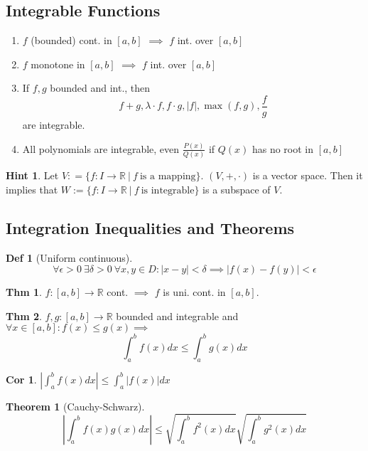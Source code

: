 \documentclass[a4paper, 10pt]{article}
\newtheorem*{corollary}{Cor}
\theoremstyle{definition}
\newtheorem*{theorem}{Thm}
\newtheorem*{definition}{Def}
\newtheorem*{note_wrapper}{Hint}
\theoremstyle{named}
\newtheorem*{ntheorem_wrapper}{Theorem}
\newenvironment{ntheorem}%
    {\begin{mdframed}[style=important]\begin{ntheorem_wrapper}}%
    {\end{ntheorem_wrapper}\end{mdframed}}
\newenvironment{note}%
    {\begin{mdframed}[style=trick]\begin{note_wrapper}}%
    {\end{note_wrapper}\end{mdframed}}
\newcommand{\R}{\mathbb{R}}
\begin{document}
\subsection{Integrable Functions}
\begin{enumerate}
    \item $f$ (bounded) cont. in $[a, b]$ $\implies$ $f$ int. over $[a, b]$
    \item $f$ monotone in $[a, b]$ $\implies$ $f$ int. over $[a, b]$
    \item If $f, g$ bounded and int., then
    $$f + g, \lambda \cdot f, f \cdot g, |f|, \max(f,g), \frac{f}{g}$$ are integrable.
    \item All polynomials are integrable, even $\frac{P(x)}{Q(x)}$ if $Q(x)$ has no root in $[a, b]$
\end{enumerate}

\begin{note}
    Let $V: = \{f: I \to \R \ | \ f \ \text{is a mapping}\}$. $(V, +, \cdot)$ is a vector space.
    Then it implies that $W := \{f: I \to \R \ | \ f \ \text{is integrable}\}$ is a subspace of $V$.
\end{note}

\subsection{Integration Inequalities and Theorems}
\begin{definition}[Uniform continuous]
    $$\forall \epsilon > 0 \ \exists \delta > 0 \ \forall x,y \in D: |x - y| < \delta \implies |f(x) - f(y)| < \epsilon $$
\end{definition}

\begin{theorem}
    $f: [a, b] \to \R$ cont. $\implies$ $f$ is uni. cont. in $[a, b]$.
\end{theorem}

\begin{theorem}
    $f, g: [a, b] \to \R$ bounded and integrable and $\forall x \in [a, b]: f(x) \leq g(x) \implies$
    $$\int_a^b f(x) dx \leq \int_a^b g(x) dx$$
\end{theorem}

\begin{corollary}
    $|\int_a^b f(x) dx| \leq \int_a^b |f(x)| dx$
\end{corollary}

\begin{ntheorem}[Cauchy-Schwarz]
    $$\left|\int_a^b f(x)g(x) dx\right| \leq \sqrt{\int_a^b f^2(x) dx}\sqrt{\int_a^b g^2(x) dx}$$
\end{ntheorem}
\end{document}
